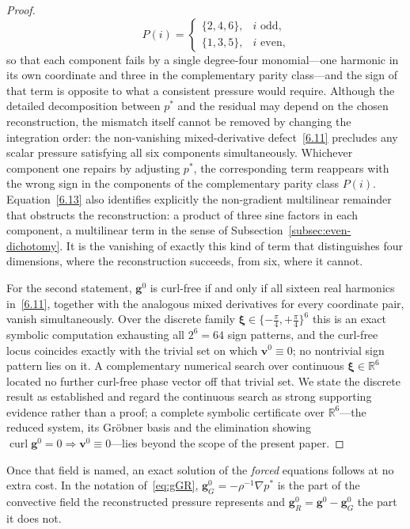 \documentclass[11pt]{jfm}
\numberwithin{equation}{section}
\begin{document}
\begin{proof}
\begin{equation}
\qquad
P(i)=\begin{cases}\{2,4,6\}, & i \text{ odd},\\[2pt] \{1,3,5\}, & i \text{ even},\end{cases}
\end{equation}
so that each component fails by a single degree-four monomial---one harmonic in its own
coordinate and three in the complementary parity class---and the sign of that term is opposite
to what a consistent pressure would require. Although the detailed decomposition between $p^{*}$ and the residual may depend on the chosen reconstruction, the mismatch itself cannot be removed by changing the integration order: the non-vanishing mixed-derivative defect~\eqref{6.11} precludes any scalar pressure satisfying all six components simultaneously. Whichever component one repairs by adjusting $p^{*}$, the corresponding term reappears with the wrong sign in the components of the complementary parity class $P(i)$. Equation~\eqref{6.13} also identifies explicitly the non-gradient multilinear remainder that obstructs the reconstruction: a product of three sine factors in each component, a multilinear term in the sense of Subsection~\ref{subsec:even-dichotomy}. It is the vanishing of exactly this kind of term that distinguishes four dimensions, where the reconstruction succeeds, from six, where it cannot.

For the second statement, $\boldsymbol{g}^0$ is curl-free if and only if all sixteen real harmonics
in~\eqref{6.11}, together with the analogous mixed derivatives for every coordinate pair, vanish
simultaneously. Over the discrete family $\boldsymbol{\xi}\in\{-\tfrac{\pi}{4},+\tfrac{\pi}{4}\}^6$
this is an exact symbolic computation exhausting all $2^6=64$ sign patterns, and the curl-free
locus coincides exactly with the trivial set on which $\boldsymbol{v}^0\equiv0$; no nontrivial
sign pattern lies on it. A complementary numerical search over continuous
$\boldsymbol{\xi}\in\mathbb{R}^6$ located no further curl-free phase vector off that trivial set.
We state the discrete result as established and regard the continuous search as strong
supporting evidence rather than a proof; a complete symbolic certificate over $\mathbb{R}^6$---the
reduced system, its Gr\"obner basis and the elimination showing $\operatorname{curl}
\boldsymbol{g}^0=0\Rightarrow\boldsymbol{v}^0\equiv0$---lies beyond the scope of the present
paper.
\end{proof}

Once that field is named, an exact solution of the \emph{forced} equations follows at no extra
cost. In the notation of~\eqref{eq:gGR}, $\boldsymbol{g}^{0}_{G}=-\rho^{-1}\nabla p^{*}$ is the
part of the convective field the reconstructed pressure represents and
$\boldsymbol{g}^{0}_{R}=\boldsymbol{g}^0-\boldsymbol{g}^{0}_{G}$ the part it does not.
\end{document}
